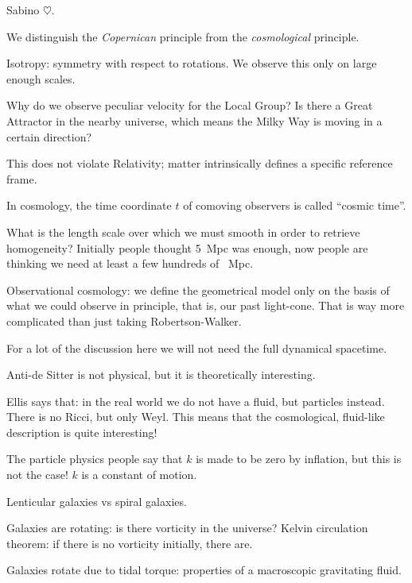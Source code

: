\documentclass[main.tex]{subfiles}
\begin{document}

Sabino $\heartsuit$. 

We distinguish the \emph{Copernican} principle from the \emph{cosmological} principle. 

Isotropy: symmetry with respect to rotations. 
We observe this only on large enough scales. 

Why do we observe peculiar velocity for the Local Group?
Is there a Great Attractor in the nearby universe, which means the 
Milky Way is moving in a certain direction? 

This does not violate Relativity; matter intrinsically defines 
a specific reference frame. 

In cosmology, the time coordinate \(t\) of comoving observers 
is called ``cosmic time''. 

What is the length scale over which we must smooth in order to 
retrieve homogeneity? 
Initially people thought \SI{5}{Mpc} was enough, 
now people are thinking we need at least a few hundreds of \SI{}{Mpc}. 

Observational cosmology: we define the geometrical model only on the basis 
of what we could observe in principle, that is, our past light-cone. 
That is way more complicated than just taking Robertson-Walker. 

For a lot of the discussion here we will not need the full dynamical spacetime. 

Anti-de Sitter is not physical, but it is theoretically interesting. 

Ellis says that: in the real world we do not have a fluid, but particles instead. 
There is no Ricci, but only Weyl. 
This means that the cosmological, fluid-like description is quite interesting! 

The particle physics people say that \(k\) is made to be zero by inflation,
but this is not the case! \(k\) is a constant of motion. 

Lenticular galaxies vs spiral galaxies. 

Galaxies are rotating: is there vorticity in the universe? 
Kelvin circulation theorem: if there is no vorticity initially, there 
are. 

Galaxies rotate due to tidal torque: properties of a macroscopic gravitating fluid. 

 
\end{document}
